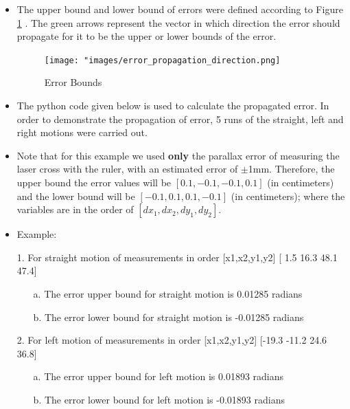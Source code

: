 {\begin{itemize}
           
            
               
          \item The upper bound and lower bound of errors were defined according to Figure \ref{fig:Error Bounds} . The green arrows represent the vector in which direction the error should propagate for it to be the upper or lower bounds of the error.    
          
          \begin{figure}[ht!] 
                        \centering
                        \texttt{[image: "images/error\_propagation\_direction.png]}
                        \caption{Error Bounds}
                        \label{fig:Error Bounds}
         \end{figure}
                
                
            
        \item The python code given below is used to calculate the propagated error. In order to demonstrate the propagation of error, 5 runs of the straight, left and right motions were carried out. 
        
        \item Note that for this example we used \textbf{only} the parallax error of measuring the laser cross with the ruler, with an estimated error of $\pm$1mm. Therefore, the upper bound the error values will be $[0.1, -0.1, -0.1, 0.1]$ (in centimeters) and the lower bound will be $[-0.1, 0.1, 0.1, -0.1]$ (in centimeters); where the variables are in the order of $[dx_1, dx_2, dy_1, dy_2]$.
        
        \item Example:
        
        \item[1.] For straight motion of measurements in order [x1,x2,y1,y2] [ 1.5 16.3 48.1 47.4]
        
        \begin{itemize}
            \item[a.] The error upper bound for straight motion is 0.01285 radians 
            \item[b.] The error lower bound for straight motion is -0.01285 radians
        \end{itemize}
        
        \item[2.] For left motion of measurements in order [x1,x2,y1,y2] [-19.3 -11.2  24.6  36.8]
        
        \begin{itemize}
            \item[a.] The error upper bound for left motion is 0.01893 radians 
            \item[b.] The error lower bound for left motion is -0.01893 radians 
        \end{itemize}


\end{itemize}}
